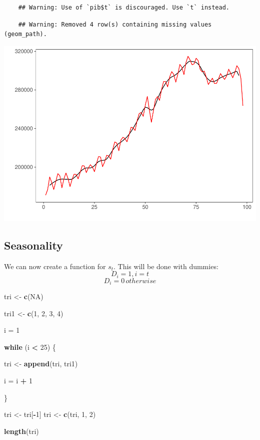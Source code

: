 \documentclass[11pt, a4paper]{report}
\newenvironment{Shaded}{\begin{snugshade}}{\end{snugshade}}
\newcommand{\ControlFlowTok}[1]{\textcolor[rgb]{0.13,0.29,0.53}{\textbf{#1}}}
\newcommand{\DecValTok}[1]{\textcolor[rgb]{0.00,0.00,0.81}{#1}}
\newcommand{\KeywordTok}[1]{\textcolor[rgb]{0.13,0.29,0.53}{\textbf{#1}}}
\newcommand{\NormalTok}[1]{#1}
\newcommand{\OperatorTok}[1]{\textcolor[rgb]{0.81,0.36,0.00}{\textbf{#1}}}
\newcommand{\OtherTok}[1]{\textcolor[rgb]{0.56,0.35,0.01}{#1}}
\newcommand{\StringTok}[1]{\textcolor[rgb]{0.31,0.60,0.02}{#1}}
\theoremstyle{plain}
\theoremstyle{plain}
\theoremstyle{remark}
\begin{document}
\begin{verbatim}
	## Warning: Use of `pib$t` is discouraged. Use `t` instead.
\end{verbatim}

\begin{verbatim}
	## Warning: Removed 4 row(s) containing missing values (geom_path).
\end{verbatim}

\begin{center}\includegraphics{Econo2_P5_files/figure-latex/moving average-1} \end{center}

\subsection{Seasonality}

We can now create a function for \(s_t\). This will be done with
dummies: \[ D_i = 1, i = t \] \[ D_i = 0 \, otherwise\]

\begin{Shaded}
	\begin{Highlighting}[]
		\NormalTok{tri <-}\StringTok{ }\KeywordTok{c}\NormalTok{(}\OtherTok{NA}\NormalTok{)}
		
		\NormalTok{tri1 <-}\StringTok{ }\KeywordTok{c}\NormalTok{(}\DecValTok{1}\NormalTok{, }\DecValTok{2}\NormalTok{, }\DecValTok{3}\NormalTok{, }\DecValTok{4}\NormalTok{)}
		
		\NormalTok{i =}\StringTok{ }\DecValTok{1}
		
		\ControlFlowTok{while}\NormalTok{ (i }\OperatorTok{<}\StringTok{ }\DecValTok{25}\NormalTok{) \{}
		
		\NormalTok{    tri <-}\StringTok{ }\KeywordTok{append}\NormalTok{(tri, tri1)}
		
		\NormalTok{    i =}\StringTok{ }\NormalTok{i }\OperatorTok{+}\StringTok{ }\DecValTok{1}
		
		\NormalTok{\}}
		
		\NormalTok{tri <-}\StringTok{ }\NormalTok{tri[}\OperatorTok{-}\DecValTok{1}\NormalTok{]}
		\NormalTok{tri <-}\StringTok{ }\KeywordTok{c}\NormalTok{(tri, }\DecValTok{1}\NormalTok{, }\DecValTok{2}\NormalTok{)}
		
		\KeywordTok{length}\NormalTok{(tri)}
	\end{Highlighting}
\end{Shaded}
\end{document}
